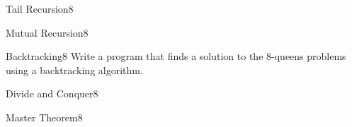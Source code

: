\documentclass[a4paper]{article}
\begin{document}
\header


\begin{problem}{Tail Recursion}{8}
\end{problem}

\begin{problem}{Mutual Recursion}{8}
\end{problem}

\begin{problem}{Backtracking}{8}
Write a program that finds a solution to the $8$-queens problems using a backtracking algorithm. 
\end{problem}

\begin{problem}{Divide and Conquer}{8}
\end{problem}

\begin{problem}{Master Theorem}{8}
\end{problem}
\end{document}
